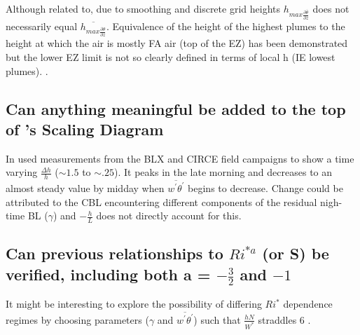 Although related to, due to smoothing and discrete grid heights $h_{max \frac{\partial \overline{\theta}}{\partial z}}$ does not necessarily equal 
$\overline{h_{max \frac{\partial {\theta}}{\partial z}}}$. Equivalence of the height of the highest plumes to the height at which the air is mostly FA air (top of the EZ) has been demonstrated but the lower EZ limit is not so clearly defined in terms of local h (IE lowest plumes).%
\cite{BrooksFowler2}. 

\subsection{Can anything meaningful be added to the top of \citeauthor{HoltNieu86} 's Scaling Diagram}

In \cite{StullNelEl} \citeauthor{StullNelEl} used measurements from the BLX and CIRCE field campaigns 
to show a time varying $\frac{\Delta h}{h}$ ($\sim1.5$ to $\sim .25$).  It peaks in the late morning
and decreases to an almost steady value by midday when $\overline{w^{'}\theta^{'}}$ begins to decrease. Change could be attributed to the CBL encountering different components of the residual nigh-time BL ($\gamma$) and  $-\frac{h}{L}$ does not directly account for this.      

\subsection{Can previous relationships to $Ri^{*a}$ (or S) be verified, including both a = $-\frac{3}{2}$ and $-1$}

It might be interesting to explore the possibility of differing $Ri^{*}$ dependence regimes by choosing parameters 
($\gamma$ and $\overline{w^{'}\theta^{'}}$) such that $\frac{hN}{W^{*}}$ straddles 6 \cite{Turner86}. 

\endinput

Any text after an \endinput is ignored.
You could put scraps here or things in progress.



